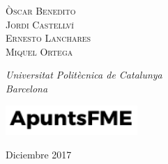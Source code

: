 \begin{titlepage}
	{\scshape\Large Òscar Benedito \\ Jordi Castellví \\ Ernesto Lanchares \\ Miquel Ortega \\} %

	\vspace{3\baselineskip} %

	\textit{Universitat Politècnica de Catalunya \\ Barcelona} %

	\vfill %


	\includegraphics[width=5cm]{../logo.pdf}

	\vspace{0.3\baselineskip} %
        

	Diciembre 2017 %


\end{titlepage}
